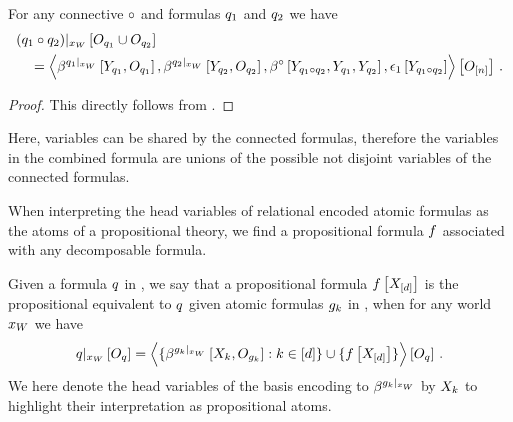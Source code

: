 \begin{theorem}
    For any connective $\circ$ and formulas $q_1$ and $q_2$ we have
    \begin{align}
        &{(q_1\circ q_2)}|_{x_{W}} \left[O_{q_1}\cup O_{q_2}\right] \\
        &\quad=
        \left\langle 
            \beta^{{q_1}|_{x_{W}}}\left[Y_{q_1},O_{q_1}\right],
            \beta^{{q_2}|_{x_{W}}}\left[Y_{q_2},O_{q_2}\right],
            \beta^{\circ}\left[Y_{q_1\circ q_2}, Y_{q_1}, Y_{q_2}\right],
            \epsilon_1\left[Y_{q_1\circ q_2}\right]
        \right\rangle \left[ O_{[n]} \right] \, .
    \end{align}
\end{theorem}
\begin{proof}
    This directly follows from .
\end{proof}

Here, variables can be shared by the connected formulas, therefore the variables in the combined formula are unions of the possible not disjoint variables of the connected formulas.


When interpreting the head variables of relational encoded atomic formulas as the atoms of a propositional theory, we find a propositional formula $f$ associated with any decomposable \firstOrderLogic{} formula.

\begin{definition}
    \label{def:propositionalEquivalent}
    Given a formula $q$ in \firstOrderLogic{}, we say that a propositional formula $f\left[X_{[d]}\right]$ is the propositional equivalent to $q$ given atomic formulas $g_{k}$ in \firstOrderLogic{}, when for any world $x_{W}$ we have
    \begin{align*}
        {q}|_{x_{W}} \left[O_{q}\right]
        = \left\langle 
            \{\beta^{{g_{k}}|_{x_{W}}}\left[X_{k},O_{g_{k}}\right] : k\in[d]\}
            \cup \{f\left[X_{[d]}\right]\}
        \right\rangle \left[ O_{q} \right] \, .
    \end{align*}
    We here denote the head variables of the basis encoding to $\beta^{{g_{k}}|_{x_{W}}}$ by $X_{k}$ to highlight their interpretation as propositional atoms.
\end{definition}

